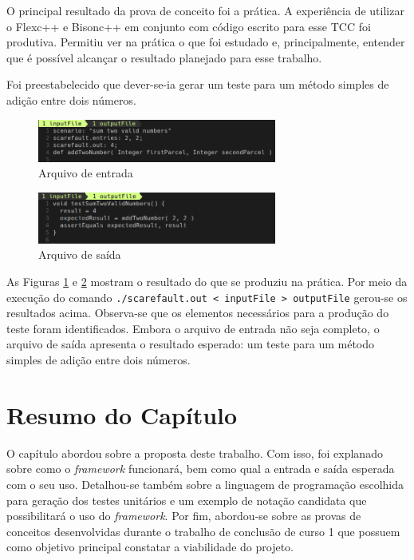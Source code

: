 \par
\indent O principal resultado da prova de conceito foi a prática. A experiência de utilizar o Flexc++ e Bisonc++ em conjunto com código escrito para esse TCC foi produtiva. Permitiu ver na prática o que foi estudado e, principalmente, entender que é possível alcançar o resultado planejado para esse trabalho.
\par
\indent Foi preestabelecido que dever-se-ia gerar um teste para um método simples de adição entre dois números.
\par
\begin{figure}[h]
    \centering
    \includegraphics[width=0.7\textwidth]{figuras/inputFile.png}
    \caption{Arquivo de entrada}
    \label{fig:inputfile}
 \end{figure}
 \par
 \begin{figure}[h]
    \centering
    \includegraphics[width=0.7\textwidth]{figuras/outputFile.png}
    \caption{Arquivo de saída}
    \label{fig:outputfile}
 \end{figure}
 \par
 \indent As Figuras \ref{fig:inputfile} e \ref{fig:outputfile} mostram o resultado do que se produziu na prática. Por meio da execução do comando \lstinline|./scarefault.out < inputFile > outputFile| gerou-se os resultados acima. Observa-se que os elementos necessários para a produção do teste foram identificados. Embora o arquivo de entrada não seja completo, o arquivo de saída apresenta o resultado esperado: um teste para um método simples de adição entre dois números.
\section{Resumo do Capítulo}
O capítulo abordou sobre a proposta deste trabalho. Com isso, foi explanado sobre como o \textit{framework} funcionará, bem como qual a entrada e saída esperada com o seu uso. Detalhou-se também sobre a linguagem de programação escolhida para geração dos testes unitários e um exemplo de notação candidata que possibilitará o uso do \textit{framework}. Por fim, abordou-se sobre as provas de conceitos desenvolvidas durante o trabalho de conclusão de curso 1 que possuem como objetivo principal constatar a viabilidade do projeto. 

 